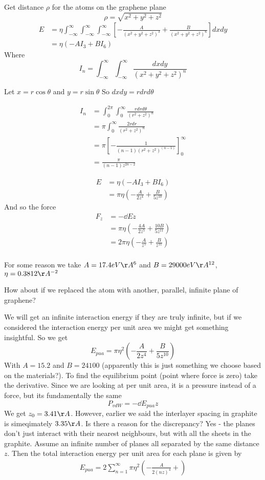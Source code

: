 \documentclass{X:/Documents/Coding/Latex/myassignment}
\begin{document}
Get distance $\rho$ for the atoms on the graphene plane
\[\rho = \sqrt{x^2 + y^2 + z^2}\]
\begin{align*}
	E &= \eta \int_{-\infty}^{\infty} \int_{-\infty}^{\infty} \int_{-\infty}^{\infty} \left[-\frac{A}{(x^2 + y^2 + z^2)^3} + \frac{B}{(x^2 + y^2 + z^2)^6}\right] dxdy\\
	&= \eta(-AI_3 + BI_6)
\end{align*}
Where 
\[I_n = \int_{-\infty}^{\infty} \int_{-\infty}^{\infty} \frac{dxdy}{(x^2+y^2+z^2)^n}\]

Let $x = r\cos\theta$ and $y = r\sin\theta$
So $dxdy = rdrd\theta$

\begin{align*}
	I_n &= \int_0^{2\pi} \int_0^{\infty} \frac{rdrd\theta}{(r^2+z^2)^n}\\
	&=	\pi \int_0^\infty \frac{2rdr}{(r^2 + z^2)^n}\\
	&= \pi \left[-\frac{1}{(n-1) (r^2+z^2)^{(n-1)}}\right]_0^\infty\\
	&= \frac{\pi}{(n-1)z^{2n-2}}
\end{align*}

\begin{align*}
	E &= \eta(-A I_3 + BI_6)\\
	&= \pi \eta \left(- \frac{A}{2z^4} + \frac{B}{5z^{10}}\right)
\end{align*}
And so the force 
\begin{align*}
	F_z &= - \dd Ez\\
	&= \pi\eta\left(-\frac{4A}{2z^5} + \frac{10B}{5z^{11}}\right)\\
	&= 2\pi\eta\left(-\frac{A}{z^5} + \frac{B}{z^{11}}\right)\\
\end{align*}

For some reason we take
$A = 17.4 eV\AA^6 $ and $B =29000 eV\AA^{12} $, $\eta = 0.3812 \AA^{-2}$

How about if we replaced the atom with another, parallel, infinite plane of graphene?


We will get an infinite interaction energy if they are truly infinite, but if we considered the interaction energy per unit area we might get something insightful.
So we get
\[E_{pua} = \pi \eta^2 \left(-\frac{A}{2z^4} + \frac{B}{5z^{10}}\right)\]
With $A=15.2$ and $B= 24100$ (apparently this is just something we choose based on the materials?).
To find the equilibrium point (point where force is zero) take the derivative.
Since we are looking at per unit area, it is a pressure instead of a force, but its fundamentally the same
\[P_{vdW} = - \dd{E_{pua}}{z}\]
We get $z_0 = 3.41 \AA$.
However, earlier we said the interlayer spacing in graphite is simeqimately $3.35 \AA$. Is there a reason for the discrepancy? Yes - the planes don't just interact with their nearest neighbours, but with all the sheets in the graphite. Assume an infinite number of planes all separated by the same distance $z$. Then the total interaction energy per unit area for each plane is given by
\begin{align*}
	E_{pua} = 2 \sum_{n=1}^\infty \pi \eta^2 \left(- \frac{A}{2(nz)^4} +\right)
\end{align*}
\end{document}
